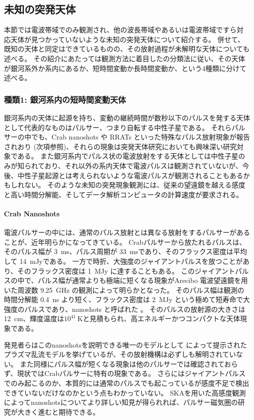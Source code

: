 \subsection{未知の突発天体} \label{transients.s1.unknowns}
本節では電波帯域でのみ観測され、他の波長帯域やあるいは電波帯域ですら対応天体が見つかっていないような未知の突発天体について紹介する。
併せて、既知の天体と同定はできているものの、その放射過程が未解明な天体についても述べる。
その紹介にあたっては観測方法に着目したの分類法に従い、その天体が銀河系外か系内にあるか、短時間変動か長時間変動か、という4種類に分けて述べる。

\subsubsection{種類1: 銀河系内の短時間変動天体}
銀河系内の天体に起源を持ち、変動の継続時間が数秒以下のパルスを発する天体として代表的なものはパルサー、つまり自転する中性子星である。
それらパルサーの中でも、Crab nanoshots や RRATs といった特殊なパルス放射現象が報告されおり (次項参照)、それらの現象は突発天体研究においても興味深い研究対象である。
また銀河系内でパルス状の電波放射をする天体としては中性子星のみが知られており、それ以外の系内天体で電波パルスは観測されていないが、今後、中性子星起源とは考えられないような電波パルスが観測されることもあるかもしれない。
そのような未知の突発現象観測には、従来の望遠鏡を越える感度と高い時間分解能、そしてデータ解析コンピュータの計算速度が要求される。

\paragraph{Crab Nanoshots}
電波パルサーの中には、通常のパルス放射とは異なる放射をするパルサーがあることが、近年明らかになってきている。
Crabパルサーから放たれるパルスは、そのパルス幅が 3~ms、パルス周期が 33~msであり、そのフラックス密度は平均して 14~mJyである。
一方で時折、大強度のジャイアントパルスを放つことがあり、そのフラックス密度は 1~MJy に達することもある。
このジャイアントパルスの中で、パルス幅が通常よりも極端に短くなる現象がArecibo 電波望遠鏡を用いた周波数 9.25~GHz の観測によって明らかとなった。
そのパルス幅は観測の時間分解能 0.4~ns より短く、フラックス密度は 2~MJy という極めて短寿命で大強度のパルスであり、nanoshots と呼ばれた \citep{2003Natur.422..141H,2007ApJ...670..693H}。
そのパルスの放射源の大きさは 12~cm、輝度温度は$10^{41}~\text{K}$と見積もられ、高エネルギーかつコンパクトな天体現象である。

発見者らはこのnanoshotsを説明できる唯一のモデルとして \citet{1998ApJ...506..341W} によって提示されたプラズマ乱流モデルを挙げているが、その放射機構は必ずしも解明されていない。
また同様にパルス幅が短くなる現象は他のパルサーでは確認されておらず、現状ではCrabパルサーに特有の現象である。
さらにはジャイアントパルスでのみ起こるのか、本質的には通常のパルスでも起こっているが感度不足で検出できていないだけなのかという点もわかっていない。
SKAを用いた高感度観測によってnanoshotsについてより詳しい知見が得られれば、パルサー磁気圏の研究が大きく進むと期待できる。

